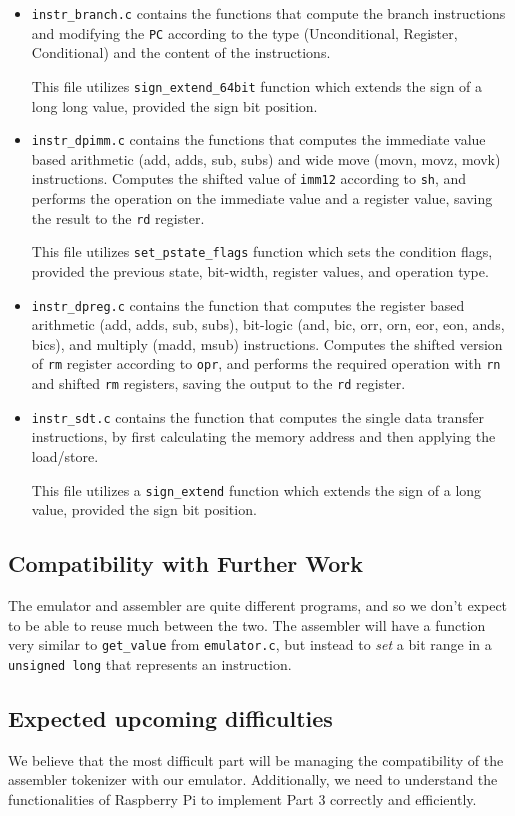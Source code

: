 \documentclass[11pt]{article}
\begin{document}
\begin{itemize}
    \item \verb|instr_branch.c| contains the functions that compute the branch instructions  and modifying the \verb|PC| according to the type (Unconditional, Register, Conditional) and the content of the instructions.  

    This file utilizes \verb|sign_extend_64bit| function which extends the sign of a long long value, provided the sign bit position.

    \item \verb|instr_dpimm.c| contains the functions that computes the immediate value based arithmetic (add, adds, sub, subs) and wide move (movn, movz, movk) instructions. Computes the shifted value of \verb|imm12| according to \verb|sh|, and performs the operation on the immediate value and a register value, saving the result to the \verb|rd| register.

    This file utilizes \verb|set_pstate_flags| function which sets the condition flags, provided the previous state, bit-width, register values, and operation type.

    \item \verb|instr_dpreg.c| contains the function that computes the register based arithmetic (add, adds, sub, subs), bit-logic (and, bic, orr, orn, eor, eon, ands, bics), and multiply (madd, msub) instructions. Computes the shifted version of \verb|rm| register according to \verb|opr|, and performs the required operation with \verb|rn| and shifted \verb|rm| registers, saving the output to the \verb|rd| register.

    \item \verb|instr_sdt.c| contains the function that computes the single data transfer instructions, by first calculating the memory address and then applying the load/store.
    
    This file utilizes a \verb|sign_extend| function which extends the sign of a long value, provided the sign bit position.

\end{itemize}

\subsection{Compatibility with Further Work}
The emulator and assembler are quite different programs, and so we don't expect to be able to reuse much between the two. The assembler will have a function very similar to \verb|get_value| from \verb|emulator.c|, but instead to \textit{set} a bit range in a \verb|unsigned long| that represents an instruction.

\subsection{Expected upcoming difficulties}
We believe that the most difficult part will be managing the compatibility of the assembler tokenizer with our emulator. Additionally, we need to understand the functionalities of Raspberry Pi to implement Part 3 correctly and efficiently.
\end{document}
